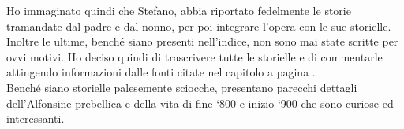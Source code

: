 Ho immaginato quindi che Stefano, abbia riportato fedelmente le storie tramandate dal padre e dal nonno, per poi integrare l'opera con le sue storielle.
Inoltre le ultime, benché siano presenti nell'indice, non sono mai state scritte per ovvi motivi. Ho deciso quindi di trascrivere tutte le storielle e di commentarle attingendo informazioni dalle fonti citate nel capitolo \textit{ }a pagina \pageref{fonti}.\\

Benché siano storielle palesemente sciocche, presentano parecchi dettagli dell'Alfonsine prebellica e della vita di fine `800 e inizio `900 che sono curiose ed interessanti.



